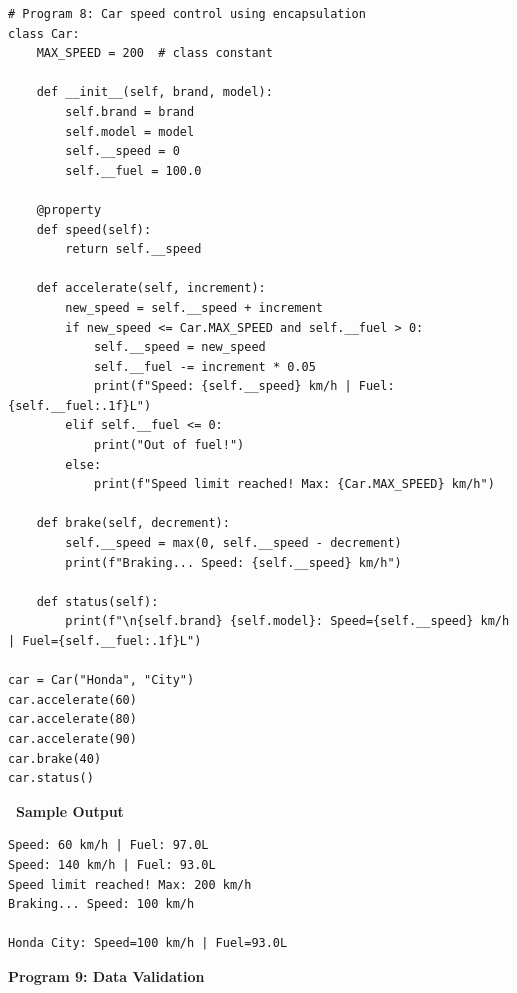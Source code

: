 \documentclass[12pt,a4paper]{article}
\newcommand{\outhead}{\noindent\colorbox{cmrgreen!25}%
  {\textbf{\small\color{cmrdark}~Sample Output~}}\par\vspace{-1pt}}
\begin{document}
\begin{lstlisting}
# Program 8: Car speed control using encapsulation
class Car:
    MAX_SPEED = 200  # class constant

    def __init__(self, brand, model):
        self.brand = brand
        self.model = model
        self.__speed = 0
        self.__fuel = 100.0

    @property
    def speed(self):
        return self.__speed

    def accelerate(self, increment):
        new_speed = self.__speed + increment
        if new_speed <= Car.MAX_SPEED and self.__fuel > 0:
            self.__speed = new_speed
            self.__fuel -= increment * 0.05
            print(f"Speed: {self.__speed} km/h | Fuel: {self.__fuel:.1f}L")
        elif self.__fuel <= 0:
            print("Out of fuel!")
        else:
            print(f"Speed limit reached! Max: {Car.MAX_SPEED} km/h")

    def brake(self, decrement):
        self.__speed = max(0, self.__speed - decrement)
        print(f"Braking... Speed: {self.__speed} km/h")

    def status(self):
        print(f"\n{self.brand} {self.model}: Speed={self.__speed} km/h | Fuel={self.__fuel:.1f}L")

car = Car("Honda", "City")
car.accelerate(60)
car.accelerate(80)
car.accelerate(90)
car.brake(40)
car.status()
\end{lstlisting}

\outhead
\begin{lstlisting}[style=outputstyle]
Speed: 60 km/h | Fuel: 97.0L
Speed: 140 km/h | Fuel: 93.0L
Speed limit reached! Max: 200 km/h
Braking... Speed: 100 km/h

Honda City: Speed=100 km/h | Fuel=93.0L
\end{lstlisting}

\vspace{0.5cm}

\textbf{Program 9: Data Validation}
\end{document}
